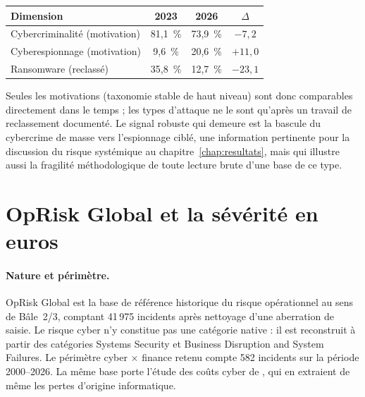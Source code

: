 \begin{center}
\renewcommand{\arraystretch}{1.3}
\begin{tabular}{>{\raggedright}p{4.5cm} c c c}
\toprule
\rowcolor{lightblue}
\textbf{Dimension} & \textbf{2023} & \textbf{2026} & \textbf{$\Delta$} \\
\midrule
Cybercriminalité (motivation) & 81{,}1~\% & 73{,}9~\% & $-7{,}2$ \\
Cyberespionnage (motivation) & 9{,}6~\% & 20{,}6~\% & $+11{,}0$ \\
Ransomware (reclassé) & 35{,}8~\% & 12{,}7~\% & $-23{,}1$ \\
\bottomrule
\end{tabular}
\end{center}

Seules les motivations (taxonomie stable de haut niveau) sont donc
comparables directement dans le temps ; les types d'attaque ne le
sont qu'après un travail de reclassement documenté. Le signal robuste qui
demeure est la bascule du cybercrime de masse vers l'espionnage ciblé, une
information pertinente pour la discussion du risque systémique au chapitre~\ref{chap:resultats},
mais qui illustre aussi la fragilité méthodologique de toute lecture brute
d'une base de ce type.




\section{OpRisk Global et la sévérité en euros}


\paragraph{Nature et périmètre.} OpRisk Global est la base de référence
historique du risque opérationnel au sens de Bâle~2/3, comptant
41\,975 incidents après nettoyage d'une aberration de saisie. Le
risque cyber n'y constitue pas une catégorie native : il est reconstruit à
partir des catégories \og Systems Security\fg{} et \og Business Disruption and
System Failures\fg{}. Le périmètre cyber $\times$ finance retenu compte
582 incidents sur la période 2000--2026. La même base porte l'étude des coûts cyber de
\citet{elingwirfs2019}, qui en extraient de même les pertes d'origine informatique.


